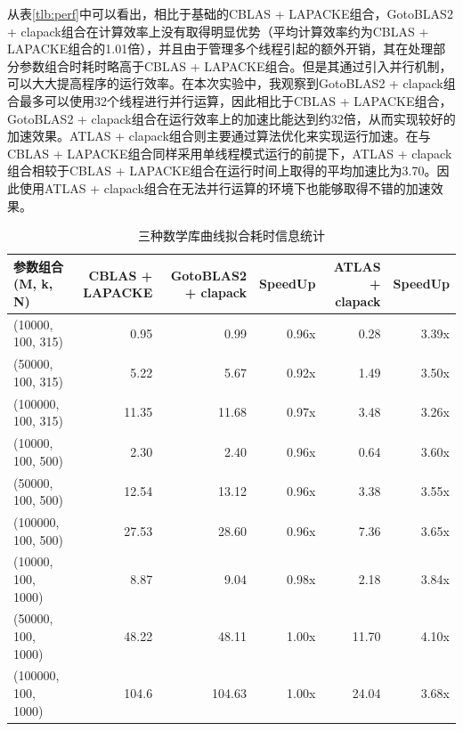 \documentclass[a4paper]{article}
\begin{document}
从表\ref{tlb:perf}中可以看出，相比于基础的CBLAS + LAPACKE组合，GotoBLAS2 + clapack组合在计算效率上没有取得明显优势（平均计算效率约为CBLAS + LAPACKE组合的1.01倍），并且由于管理多个线程引起的额外开销，其在处理部分参数组合时耗时略高于CBLAS + LAPACKE组合。但是其通过引入并行机制，可以大大提高程序的运行效率。在本次实验中，我观察到GotoBLAS2 + clapack组合最多可以使用32个线程进行并行运算，因此相比于CBLAS + LAPACKE组合，GotoBLAS2 + clapack组合在运行效率上的加速比能达到约32倍，从而实现较好的加速效果。ATLAS + clapack组合则主要通过算法优化来实现运行加速。在与CBLAS + LAPACKE组合同样采用单线程模式运行的前提下，ATLAS + clapack组合相较于CBLAS + LAPACKE组合在运行时间上取得的平均加速比为3.70。因此使用ATLAS + clapack组合在无法并行运算的环境下也能够取得不错的加速效果。



\begin{table}[tbp]
  \centering
  \caption{三种数学库曲线拟合耗时信息统计}
  \begin{tabular}{l|r|rr|rr}
    \toprule
    参数组合(M, k, N)   & CBLAS + LAPACKE & GotoBLAS2 + clapack & SpeedUp & ATLAS + clapack & SpeedUp \\
    \midrule
    (10000, 100, 315)   & 0.95            & 0.99                & 0.96x   & 0.28            & 3.39x   \\
    \midrule
    (50000, 100, 315)   & 5.22            & 5.67                & 0.92x   & 1.49            & 3.50x   \\
    \midrule
    (100000, 100, 315)  & 11.35           & 11.68               & 0.97x   & 3.48            & 3.26x   \\
    \midrule
    (10000, 100, 500)   & 2.30            & 2.40                & 0.96x   & 0.64            & 3.60x   \\
    \midrule
    (50000, 100, 500)   & 12.54           & 13.12               & 0.96x   & 3.38            & 3.55x   \\
    \midrule
    (100000, 100, 500)  & 27.53           & 28.60               & 0.96x   & 7.36            & 3.65x   \\
    \midrule
    (10000, 100, 1000)  & 8.87            & 9.04                & 0.98x   & 2.18            & 3.84x   \\
    \midrule
    (50000, 100, 1000)  & 48.22           & 48.11               & 1.00x   & 11.70           & 4.10x   \\
    \midrule
    (100000, 100, 1000) & 104.6           & 104.63              & 1.00x   & 24.04           & 3.68x   \\

\end{tabular}
\end{table}
\end{document}
